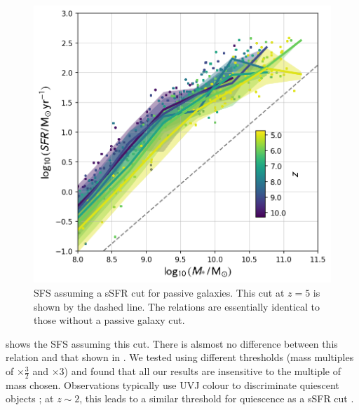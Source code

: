 \begin{figure}
	\includegraphics[width=\columnwidth]{images/sfs_all_cut.png}
    \caption{SFS assuming a sSFR cut for passive galaxies. This cut at $z = 5$ is shown by the dashed line. The relations are essentially identical to those without a passive galaxy cut.
    }
    \label{fig:sfs_all_cut}
\end{figure}

 shows the SFS assuming this cut.
There is alsmost no difference between this relation and that shown in .
We tested using different thresholds (mass multiples of $\times \frac{3}{2}$ and $\times 3$) and found that all our results are insensitive to the multiple of mass chosen.
Observations typically use UVJ colour to discriminate quiescent objects \citep[e.g.][]{whitaker_newfirm_2011}; at $z \sim 2$, this leads to a similar threshold for quiescence as a sSFR cut \citep{fang_demographics_2018}.
